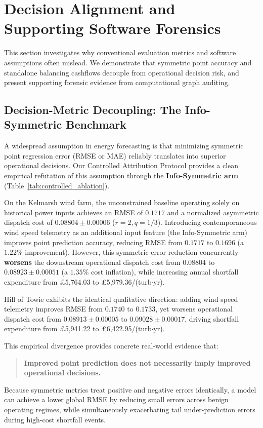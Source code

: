 \section{Decision Alignment and Supporting Software Forensics}
\label{sec:alignment}

This section investigates why conventional evaluation metrics and software assumptions often mislead. We demonstrate that symmetric point accuracy and standalone balancing cashflows decouple from operational decision risk, and present supporting forensic evidence from computational graph auditing.

\subsection{Decision-Metric Decoupling: The Info-Symmetric Benchmark}
A widespread assumption in energy forecasting is that minimizing symmetric point regression error (RMSE or MAE) reliably translates into superior operational decisions. Our Controlled Attribution Protocol provides a clean empirical refutation of this assumption through the \textbf{Info-Symmetric arm} (Table~\ref{tab:controlled_ablation}).

On the Kelmarsh wind farm, the unconstrained baseline operating solely on historical power inputs achieves an RMSE of $0.1717$ and a normalized asymmetric dispatch cost of $0.08804 \pm 0.00006$ ($r=2, q=1/3$). Introducing contemporaneous wind speed telemetry as an additional input feature (the Info-Symmetric arm) improves point prediction accuracy, reducing RMSE from $0.1717$ to $0.1696$ (a $1.22\%$ improvement). However, this symmetric error reduction concurrently \textbf{worsens} the downstream operational dispatch cost from $0.08804$ to $0.08923 \pm 0.00051$ (a $1.35\%$ cost inflation), while increasing annual shortfall expenditure from \pounds 5,764.03 to \pounds 5,979.36/(turb$\cdot$yr).

Hill of Towie exhibits the identical qualitative direction: adding wind speed telemetry improves RMSE from $0.1740$ to $0.1733$, yet worsens operational dispatch cost from $0.08913 \pm 0.00005$ to $0.09028 \pm 0.00017$, driving shortfall expenditure from \pounds 5,941.22 to \pounds 6,422.95/(turb$\cdot$yr).

This empirical divergence provides concrete real-world evidence that:
\begin{quote}
\textbf{Improved point prediction does not necessarily imply improved operational decisions.}
\end{quote}
Because symmetric metrics treat positive and negative errors identically, a model can achieve a lower global RMSE by reducing small errors across benign operating regimes, while simultaneously exacerbating tail under-prediction errors during high-cost shortfall events.

